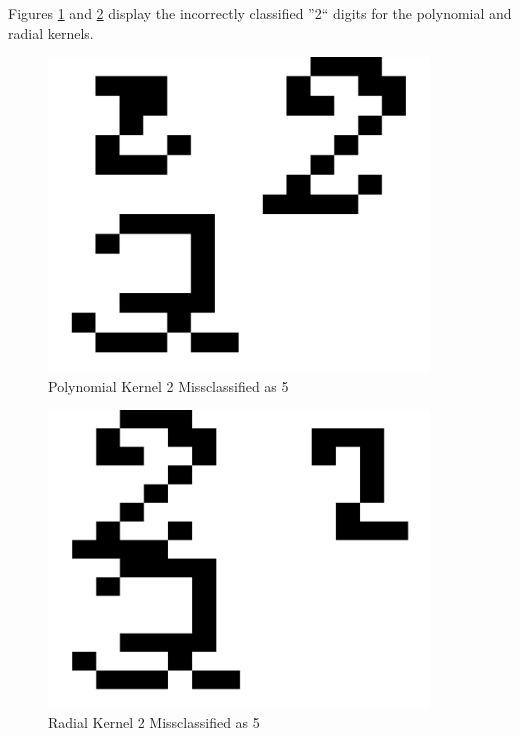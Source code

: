 \documentclass{article}
\begin{document}
Figures \ref{poly2errortest} and \ref{radial2errortest} display the incorrectly classified ''2`` digits for the polynomial and radial kernels.

\begin{figure}
\centering
\includegraphics[width=0.9\textwidth]{images/test2_5_correct2_class5_a0156.png}
\caption{Polynomial Kernel 2 Missclassified as 5}
\label{poly2errortest}
\end{figure}

\begin{figure}
\centering
\includegraphics[width=0.9\textwidth]{images/test2_5_correct2_class5_radial.png}
\caption{Radial Kernel 2 Missclassified as 5}
\label{radial2errortest}
\end{figure}
\end{document}
